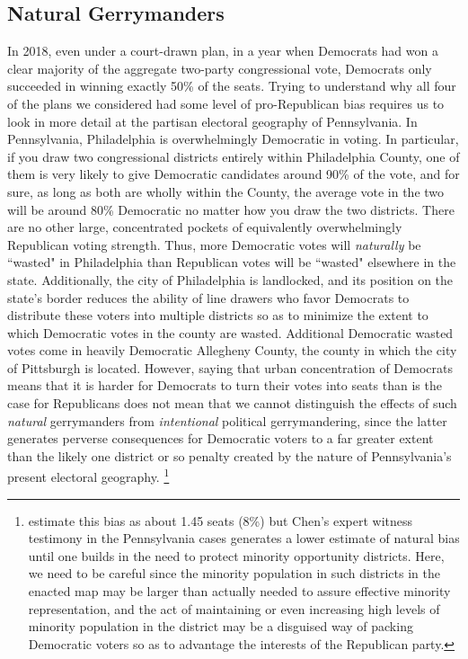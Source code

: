         \subsection*{Natural Gerrymanders}
    In 2018, even under a court-drawn plan, in a year when Democrats had won a clear majority of the aggregate two-party congressional vote, Democrats only succeeded in winning exactly 50\% of the seats. Trying to understand why all four of the plans we considered had some level of pro-Republican bias requires us to look in more detail at the partisan electoral geography of Pennsylvania. In Pennsylvania, Philadelphia is overwhelmingly Democratic in voting. In particular, if you draw two congressional districts entirely within Philadelphia County, one of them is very likely to give Democratic candidates around 90\% of the vote, and for sure, as long as both are wholly within the County, the average vote in the two will be around 80\% Democratic no matter how you draw the two districts. There are no other large, concentrated pockets of equivalently overwhelmingly Republican voting strength. Thus, more Democratic votes will \textit{naturally} be ``wasted" in Philadelphia than Republican votes will be ``wasted" elsewhere in the state. Additionally, the city of Philadelphia is landlocked, and its position on the state's border reduces the ability of line drawers who favor Democrats to distribute these voters into multiple districts so as to minimize the extent to which Democratic votes in the county are wasted. Additional Democratic wasted votes come in heavily Democratic Allegheny County, the county in which the city of Pittsburgh is located. However, saying that urban concentration of Democrats means that it is harder for Democrats to turn their votes into seats than is the case for Republicans does not mean that we cannot distinguish the effects of such \textit{natural} gerrymanders from \textit{intentional} political gerrymandering, since the latter generates perverse consequences for Democratic voters to a far greater extent than the likely one district or so penalty created by the nature of Pennsylvania’s present electoral geography. 
        \footnote{\citet{Chen2013} estimate this bias as about 1.45 seats (8\%) but Chen’s expert witness testimony in the Pennsylvania cases generates a lower estimate of natural bias until one builds in the need to protect minority opportunity districts. Here, we need to be careful since the minority population in such districts in the enacted map may be larger than actually needed to assure effective minority representation, and the act of maintaining or even increasing high levels of minority population in the district may be a disguised way of packing Democratic voters so as to advantage the interests of the Republican party.}
